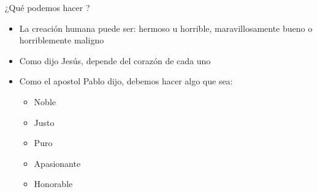 \documentclass{beamer}
\begin{document}
\begin{frame}{¿Qué podemos hacer ?}
\begin{itemize}
\item La creación humana puede ser: hermoso u horrible, maravillosamente bueno o horriblemente maligno
\item Como dijo Jesús, depende del corazón de cada uno
\item Como el apostol Pablo dijo, debemos hacer algo que sea:

	\begin{itemize}
	\item Noble
	\item Justo
	\item Puro
	\item Apasionante
	\item Honorable

	\end{itemize}

\end{itemize}
\end{frame}
\end{document}
